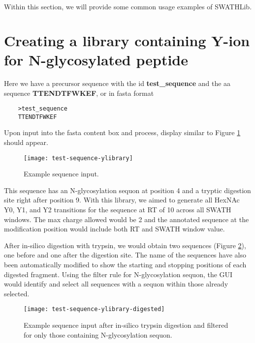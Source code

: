\documentclass[../manual.tex]{subfiles}
\begin{document}
Within this section, we will provide some common usage examples of SWATHLib.

\section{Creating a library containing Y-ion for N-glycosylated peptide}
Here we have a precursor sequence with the id \textbf{test\_sequence} and the aa sequence \textbf{TTENDTFWKEF}, or in fasta format \par
\begin{verbatim}
	>test_sequence
	TTENDTFWKEF
\end{verbatim}

Upon input into the fasta content box and process, display similar to Figure \ref{fig:testsequenceylibrary} should appear.

\begin{figure}[H]
	\centering
	\begin{framed}
        \centering
        \begin{adjustbox}{width=1\textwidth}
			\texttt{[image: test-sequence-ylibrary]}
		\end{adjustbox}
		\caption{Example sequence input.}\label{fig:testsequenceylibrary}
	\end{framed}
\end{figure}


This sequence has an N-glycosylation sequon at position 4 and a tryptic digestion site right after position 9. With this library, we aimed to generate all HexNAc Y0, Y1, and Y2 transitions for the sequence at RT of 10 across all SWATH windows. The max charge allowed would be 2 and the annotated sequence at the modification position would include both RT and SWATH window value.\par


After in-silico digestion with trypsin, we would obtain two sequences (Figure \ref{fig:testsequenceylibrarydigested}), one before and one after the digestion site. The name of the sequences have also been automatically modified to show the starting and stopping positions of each digested fragment. Using the filter rule for N-glycosylation sequon, the GUI would identify and select all sequences with a sequon within those already selected.
\begin{figure}[H]
	\centering
	\begin{framed}
        \centering
        \begin{adjustbox}{width=1\textwidth}
			\texttt{[image: test-sequence-ylibrary-digested]}
		\end{adjustbox}
		\caption{Example sequence input after in-silico trypsin digestion and filtered for only those containing N-glycosylation sequon.}\label{fig:testsequenceylibrarydigested}
	\end{framed}
\end{figure}
\end{document}
